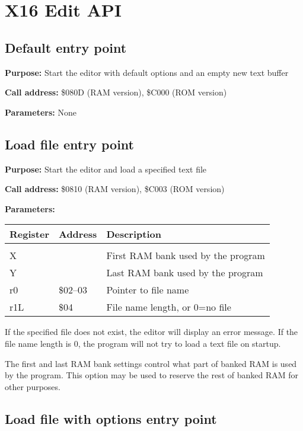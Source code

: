 \documentclass{article}
\begin{document}
\newpage
\section{X16 Edit API}

    \subsection{Default entry point}

        \textbf{Purpose:} Start the editor with default options and an empty new text buffer

        \textbf{Call address:} \$080D (RAM version), \$C000 (ROM version)
    
        \textbf{Parameters:} None

    \subsection{Load file entry point}
        
        \textbf{Purpose:} Start the editor and load a specified text file

        \textbf{Call address:} \$0810 (RAM version), \$C003 (ROM version)

        \textbf{Parameters:} 

        \begin{longtable}[l]{l l l}
            \textbf{Register} & \textbf{Address} & \textbf{Description} \\
	        \hline \\
            X   &          & First RAM bank used by the program \\
            Y   &          & Last RAM bank used by the program \\
            r0  & \$02--03 & Pointer to file name \\
            r1L & \$04     & File name length, or 0=no file \\
        \end{longtable}

        If the specified file does not exist, the editor will display an
        error message. If the file name length is 0, the program will not try
        to load a text file on startup.

        The first and last RAM bank settings control what part of banked RAM is
        used by the program. This option may be used to reserve the rest of banked RAM
        for other purposes.

    \subsection{Load file with options entry point}
\end{document}
